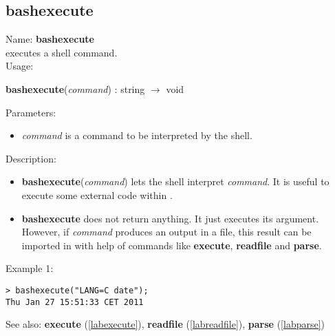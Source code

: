 \subsection{bashexecute}
\label{labbashexecute}
\noindent Name: \textbf{bashexecute}\\
executes a shell command.\\
\noindent Usage: 
\begin{center}
\textbf{bashexecute}(\emph{command}) : \textsf{string} $\rightarrow$ \textsf{void}\\
\end{center}
Parameters: 
\begin{itemize}
\item \emph{command} is a command to be interpreted by the shell.
\end{itemize}
\noindent Description: \begin{itemize}

\item \textbf{bashexecute}(\emph{command}) lets the shell interpret \emph{command}. It is useful to execute
   some external code within \sollya.

\item \textbf{bashexecute} does not return anything. It just executes its argument. However, if
   \emph{command} produces an output in a file, this result can be imported in \sollya
   with help of commands like \textbf{execute}, \textbf{readfile} and \textbf{parse}.
\end{itemize}
\noindent Example 1: 
\begin{center}\begin{minipage}{15cm}\begin{Verbatim}[frame=single]
> bashexecute("LANG=C date");
Thu Jan 27 15:51:33 CET 2011
\end{Verbatim}
\end{minipage}\end{center}
See also: \textbf{execute} (\ref{labexecute}), \textbf{readfile} (\ref{labreadfile}), \textbf{parse} (\ref{labparse})
